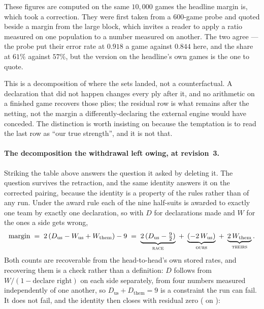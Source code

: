 \documentclass[11pt,letterpaper]{article}
\begin{document}
These figures are computed on the same $10{,}000$ games the headline margin
is, which took a correction. They were first taken from a $600$-game probe
and quoted beside a margin from the large block, which invites a reader to
apply a ratio measured on one population to a number measured on another.
The two agree --- the probe put their error rate at $0.918$ a game against
$0.844$ here, and the share at $61\%$ against $57\%$, but the version on
the headline's own games is the one to quote.

This is a decomposition of where the sets landed, not a counterfactual. A
declaration that did not happen changes every ply after it, and no arithmetic
on a finished game recovers those plies; the residual row is what remains
after the netting, not the margin a differently-declaring the external engine would have
conceded. The distinction is worth insisting on because the temptation is to
read the last row as ``our true strength'', and it is not that.

\paragraph{The decomposition the withdrawal left owing, at revision~3.}
\label{sec:res-rev3channels}
Striking the table above answers the question it asked by deleting it. The
question survives the retraction, and the same identity answers it on the
corrected pairing, because the identity is a property of the rules rather
than of any run. Under the award rule each of the nine half-suits is awarded
to exactly one team by exactly one declaration, so with $D$ for declarations
made and $W$ for the ones a side gets wrong,
\[
  \text{margin} \;=\; 2\,(D_{\text{us}} - W_{\text{us}} + W_{\text{them}}) - 9
  \;=\; \underbrace{2\,(D_{\text{us}} - \tfrac{9}{2})}_{\textsc{race}}
  \;+\; \underbrace{(-2\,W_{\text{us}})}_{\textsc{ours}}
  \;+\; \underbrace{2\,W_{\text{them}}}_{\textsc{theirs}} .
\]
Both counts are recoverable from the head-to-head's own stored rates, and
recovering them is a check rather than a definition: $D$ follows from
$W/(1-\text{declare right})$ on each side separately, from four numbers
measured independently of one another, so $D_{\text{us}} + D_{\text{them}} =
9$ is a constraint the run can fail. It does not fail, and the identity then
closes with residual zero
( on ):
\end{document}
